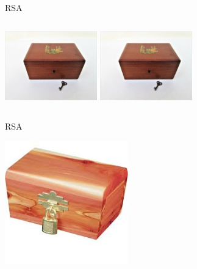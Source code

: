\documentclass{beamer}
\begin{document}
\begin{frame}{RSA}
\begin{columns}
\begin{column}[T]{0.5\textwidth}
			\includegraphics[width=0.3\textwidth]{img/box.jpg}
			\includegraphics[width=0.3\textwidth]{img/box.jpg}
		\end{column}
	\end{columns}
\end{frame}

\begin{frame}{RSA}
	\begin{center}
		\includegraphics[width=0.4\textwidth]{img/padlock.jpeg}
	\end{center}
\end{frame}
\end{document}
